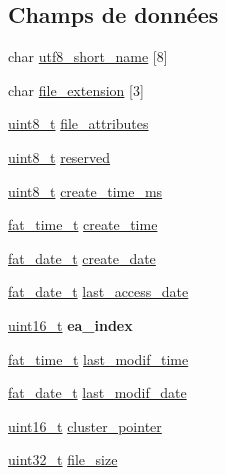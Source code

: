 \subsection*{\-Champs de données}
\begin{DoxyCompactItemize}
\item 
char \hyperlink{struct__fat__dir__entry_abb18201b12e6039275e6dad91c19a99d}{utf8\-\_\-short\-\_\-name} \mbox{[}8\mbox{]}
\item 
char \hyperlink{struct__fat__dir__entry_addf0d1b2feefb5d50d90ea66b06703b9}{file\-\_\-extension} \mbox{[}3\mbox{]}
\item 
\hyperlink{types_8h_aba7bc1797add20fe3efdf37ced1182c5}{uint8\-\_\-t} \hyperlink{struct__fat__dir__entry_a4672718a4c89a279dd1c2b083ea73789}{file\-\_\-attributes}
\item 
\hyperlink{types_8h_aba7bc1797add20fe3efdf37ced1182c5}{uint8\-\_\-t} \hyperlink{struct__fat__dir__entry_a27e7962cefa12233338034dff3d75304}{reserved}
\item 
\hyperlink{types_8h_aba7bc1797add20fe3efdf37ced1182c5}{uint8\-\_\-t} \hyperlink{struct__fat__dir__entry_a54232a69203bce440a4bfaca30abcd00}{create\-\_\-time\-\_\-ms}
\item 
\hyperlink{fat__internal_8h_ab864004b9f8da2db1862a0da9acb1735}{fat\-\_\-time\-\_\-t} \hyperlink{struct__fat__dir__entry_a3c6cbf375afefcf8fc1518d5a96790a8}{create\-\_\-time}
\item 
\hyperlink{fat__internal_8h_a50b52e2d394a6d7c7f1f2b7c7ef93a19}{fat\-\_\-date\-\_\-t} \hyperlink{struct__fat__dir__entry_ac30b1ec037ee7658eda85b2dc09e5c2e}{create\-\_\-date}
\item 
\hyperlink{fat__internal_8h_a50b52e2d394a6d7c7f1f2b7c7ef93a19}{fat\-\_\-date\-\_\-t} \hyperlink{struct__fat__dir__entry_aa53da680ae2a6594c0f956c80a1b8ca4}{last\-\_\-access\-\_\-date}
\item 
\hypertarget{struct__fat__dir__entry_a4e4d3ec0d8662c572bb2ac7f9c4bc4c8}{\hyperlink{types_8h_adf4d876453337156dde61095e1f20223}{uint16\-\_\-t} {\bfseries ea\-\_\-index}}\label{struct__fat__dir__entry_a4e4d3ec0d8662c572bb2ac7f9c4bc4c8}

\item 
\hyperlink{fat__internal_8h_ab864004b9f8da2db1862a0da9acb1735}{fat\-\_\-time\-\_\-t} \hyperlink{struct__fat__dir__entry_a967f3fe06020a24a22bc83cb80637669}{last\-\_\-modif\-\_\-time}
\item 
\hyperlink{fat__internal_8h_a50b52e2d394a6d7c7f1f2b7c7ef93a19}{fat\-\_\-date\-\_\-t} \hyperlink{struct__fat__dir__entry_a9be27b92458730fbdf5342f717aadc32}{last\-\_\-modif\-\_\-date}
\item 
\hyperlink{types_8h_adf4d876453337156dde61095e1f20223}{uint16\-\_\-t} \hyperlink{struct__fat__dir__entry_ae129dc6a378e1bec5c92a3963d6522c6}{cluster\-\_\-pointer}
\item 
\hyperlink{types_8h_a33594304e786b158f3fb30289278f5af}{uint32\-\_\-t} \hyperlink{struct__fat__dir__entry_a557cd14b001d64851ad5e7cadb742411}{file\-\_\-size}
\end{DoxyCompactItemize}


